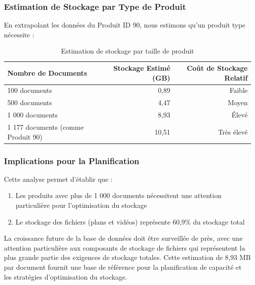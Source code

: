 \documentclass[12pt,a4paper]{article}
\begin{document}
\subsubsection{Estimation de Stockage par Type de Produit}
En extrapolant les données du Produit ID 90, nous estimons qu'un produit type nécessite :

\begin{table}[h]
\centering
\begin{tabular}{|l|r|r|}
\hline
\textbf{Nombre de Documents} & \textbf{Stockage Estimé (GB)} & \textbf{Coût de Stockage Relatif} \\
\hline
100 documents & 0,89 & Faible \\
500 documents & 4,47 & Moyen \\
1 000 documents & 8,93 & Élevé \\
1 177 documents (comme Produit 90) & 10,51 & Très élevé \\
\hline
\end{tabular}
\caption{Estimation de stockage par taille de produit}
\end{table}

\subsubsection{Implications pour la Planification}
Cette analyse permet d'établir que :
\begin{enumerate}
    \item Les produits avec plus de 1 000 documents nécessitent une attention particulière pour l'optimisation du stockage
    \item Le stockage des fichiers (plans et vidéos) représente 60,9\% du stockage total
\end{enumerate}

La croissance future de la base de données doit être surveillée de près, avec une attention particulière aux composants de stockage de fichiers qui représentent la plus grande partie des exigences de stockage totales. Cette estimation de 8,93 MB par document fournit une base de référence pour la planification de capacité et les stratégies d'optimisation du stockage.
\end{document}
